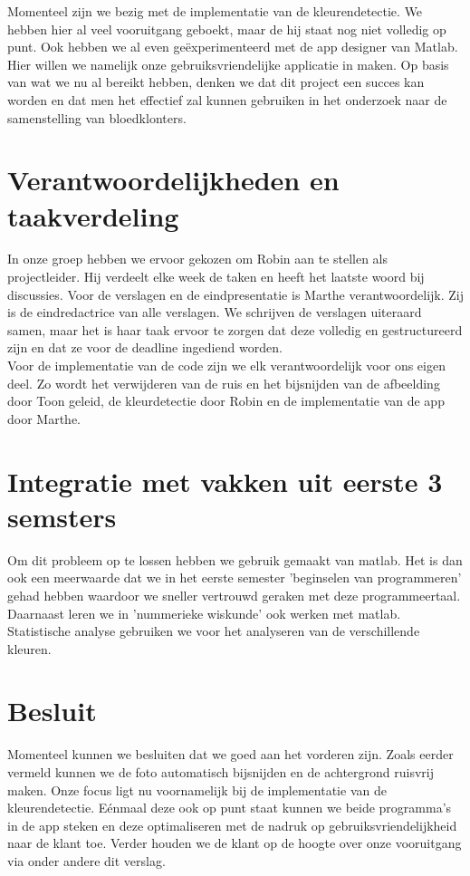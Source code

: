\documentclass[a4paper,kulak]{kulakarticle}
\begin{document}
		
		Momenteel zijn we bezig met de implementatie van de kleurendetectie. We hebben hier al veel vooruitgang geboekt, maar de hij staat nog niet volledig op punt. Ook hebben we al even geëxperimenteerd met de app designer van Matlab. Hier willen we namelijk onze gebruiksvriendelijke applicatie in maken.
		Op basis van wat we nu al bereikt hebben, denken we dat dit project een succes kan worden en dat men het effectief zal kunnen gebruiken in het onderzoek naar de samenstelling van bloedklonters.
	
	\section{Verantwoordelijkheden en taakverdeling}		
		In onze groep hebben we ervoor gekozen om Robin aan te stellen als projectleider. Hij verdeelt elke week de taken en heeft het laatste woord bij discussies. 
		Voor de verslagen en de eindpresentatie is Marthe verantwoordelijk. Zij is de eindredactrice van alle verslagen. We schrijven de verslagen uiteraard samen, maar het is haar taak ervoor te zorgen dat deze volledig en gestructureerd zijn en dat ze voor de deadline ingediend worden.\\
		Voor de implementatie van de code zijn we elk verantwoordelijk voor ons eigen deel. Zo wordt het verwijderen van de ruis en het bijsnijden van de afbeelding door Toon geleid, de kleurdetectie door Robin en de implementatie van de app door Marthe.
		
	\section{Integratie met vakken uit eerste 3 semsters}
		Om dit probleem op te lossen hebben we gebruik gemaakt van matlab. Het is dan ook een meerwaarde dat we in het eerste semester 'beginselen van programmeren' gehad hebben waardoor we sneller vertrouwd geraken met deze programmeertaal. Daarnaast leren we in 'nummerieke wiskunde' ook werken met matlab. Statistische analyse gebruiken we voor het analyseren van de verschillende kleuren.
	
	\section{Besluit}	
		Momenteel kunnen we besluiten dat we goed aan het vorderen zijn. Zoals eerder vermeld kunnen we de foto automatisch bijsnijden en de achtergrond ruisvrij maken. Onze focus ligt nu voornamelijk bij de implementatie van de kleurendetectie. Eénmaal deze ook op punt staat kunnen we beide programma's in de app steken en deze optimaliseren met de nadruk op gebruiksvriendelijkheid naar de klant toe. Verder houden we de klant op de hoogte over onze vooruitgang via onder andere dit verslag. 
\end{document}
